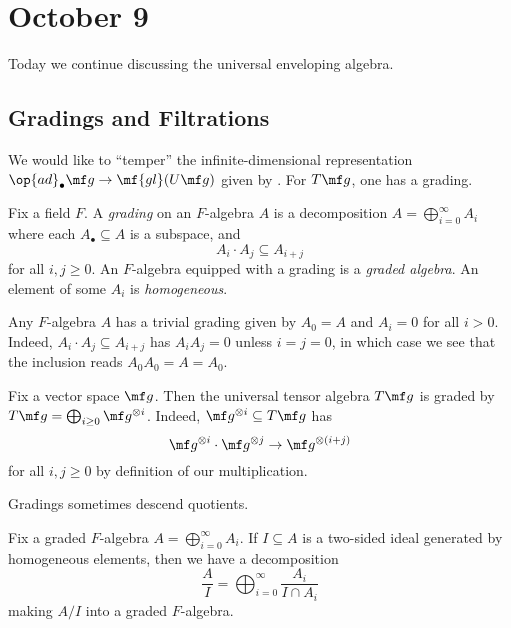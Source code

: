 \documentclass[../notes.tex]{subfiles}
\begin{document}
\section{October 9}
Today we continue discussing the universal enveloping algebra.

\subsection{Gradings and Filtrations}
We would like to ``temper'' the infinite-dimensional representation $\op{ad}_\bullet\mf g\to\mf{gl}(U\mf g)$ given by . For $T\mf g$, one has a grading.
\begin{definition}
	Fix a field $F$. A \textit{grading} on an $F$-algebra $A$ is a decomposition $A=\bigoplus_{i=0}^\infty A_i$ where each $A_\bullet\subseteq A$ is a subspace, and
	\[A_i\cdot A_j\subseteq A_{i+j}\]
	for all $i,j\ge0$. An $F$-algebra equipped with a grading is a \textit{graded algebra}. An element of some $A_i$ is \textit{homogeneous}.
\end{definition}
\begin{example}
	Any $F$-algebra $A$ has a trivial grading given by $A_0=A$ and $A_i=0$ for all $i>0$. Indeed, $A_i\cdot A_j\subseteq A_{i+j}$ has $A_iA_j=0$ unless $i=j=0$, in which case we see that the inclusion reads $A_0A_0=A=A_0$.
\end{example}
\begin{example} \label{ex:grade-tensor-algebra}
	Fix a vector space $\mf g$. Then the universal tensor algebra $T\mf g$ is graded by $T\mf g=\bigoplus_{i\ge0}\mf g^{\otimes i}$. Indeed, $\mf g^{\otimes i}\subseteq T\mf g$ has
	\[\mf g^{\otimes i}\cdot\mf g^{\otimes j}\to\mf g^{\otimes(i+j)}\]
	for all $i,j\ge0$ by definition of our multiplication.
\end{example}
Gradings sometimes descend quotients.
\begin{lemma} \label{lem:homogeneous-ideal-quotient}
	Fix a graded $F$-algebra $A=\bigoplus_{i=0}^\infty A_i$. If $I\subseteq A$ is a two-sided ideal generated by homogeneous elements, then we have a decomposition
	\[\frac AI=\bigoplus_{i=0}^\infty\frac{A_i}{I\cap A_i}\]
	making $A/I$ into a graded $F$-algebra.
\end{lemma}
\end{document}

